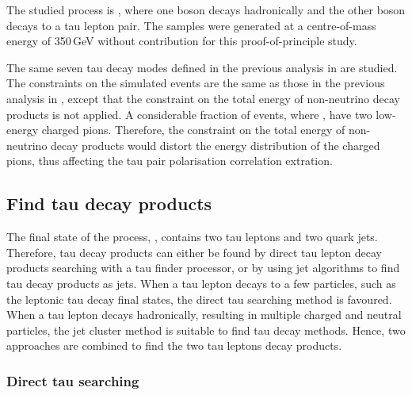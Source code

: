 The studied process  is \HepProcess{\Pep \Pem \to \PZ \PZ}, where one \PZ boson decays hadronically and the other \PZ boson decays to a tau lepton pair. The samples were generated at a centre-of-mass energy of 350\,GeV without \ISR contribution for this proof-of-principle study.

The same seven tau decay modes defined in the previous analysis in  are studied. The constraints on the simulated events are the same as those   in the previous analysis in , except that the constraint on the total energy of non-neutrino decay products is not applied. A considerable fraction of \ZToTauTau events, where \tauToPion, have two low-energy charged pions. Therefore, the constraint on the total energy of non-neutrino decay products would distort the energy distribution of the charged pions, thus affecting the tau pair polarisation correlation extration.


\subsection{Find tau decay products}
\label{sec:tauHZfindTau}

The final state of the process, \eeZZQQ, contains two tau leptons and two quark jets. Therefore, tau decay products can either be found by direct tau lepton decay products searching with a tau finder processor, or by using jet algorithms to find tau decay products as jets. When a tau lepton decays to a few particles, such as the leptonic tau decay final states, the direct tau searching method is favoured. When a tau lepton decays hadronically, resulting in multiple charged and neutral particles, the jet cluster method is suitable to find tau decay methods. Hence, two approaches are combined to find the two tau leptons decay products.


\subsubsection{Direct tau searching}

